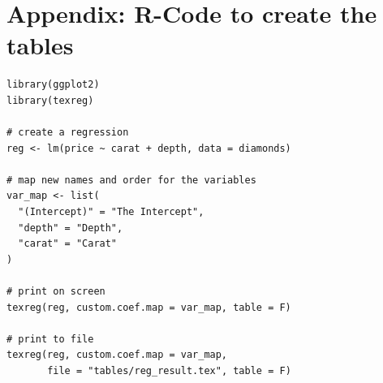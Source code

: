 \documentclass[12pt,a4paper]{article}
\begin{document}
\newpage

\printbibliography

\newpage

\section{Appendix: R-Code to create the tables}
\label{sec:appendix}
\begin{verbatim}
library(ggplot2)
library(texreg)

# create a regression
reg <- lm(price ~ carat + depth, data = diamonds)

# map new names and order for the variables
var_map <- list(
  "(Intercept)" = "The Intercept",
  "depth" = "Depth",
  "carat" = "Carat"
)

# print on screen
texreg(reg, custom.coef.map = var_map, table = F)

# print to file
texreg(reg, custom.coef.map = var_map,
       file = "tables/reg_result.tex", table = F)
\end{verbatim}

\newpage

\end{document}
